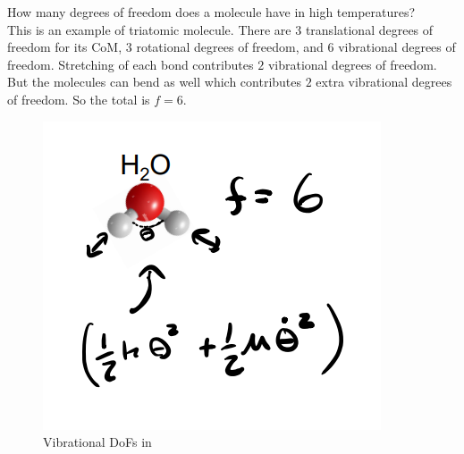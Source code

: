 \documentclass[12pt, a4paper]{article}
\newcounter{exa}
\begin{document}
\begin{texample}
How many degrees of freedom does a  molecule have in high temperatures? \\

This is an example of triatomic molecule. There are $3$ translational degrees of freedom for its CoM, $3$ rotational degrees of freedom, and $6$ vibrational degrees of freedom. Stretching of each bond contributes $2$ vibrational degrees of freedom. But the molecules can bend as well which contributes $2$ extra vibrational degrees of freedom. So the total is $f=6$.

\begin{figure}[H]
\centering
\includegraphics[width=100mm]{19.png}
\caption{Vibrational DoFs in }
\end{figure}
\end{texample}
\end{document}
